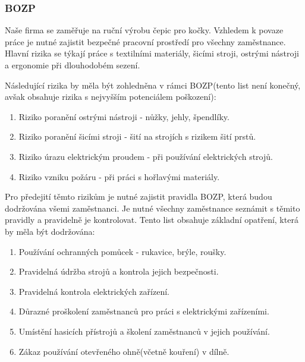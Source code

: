 \documentclass[12pt, a4paper]{article}
\begin{document}
\pagebreak

\subsubsection{BOZP}

Naše firma se zaměřuje na ruční výrobu čepic pro kočky. 
Vzhledem k povaze práce je nutné zajistit bezpečné pracovní prostředí pro všechny zaměstnance. 
Hlavní rizika se týkají práce s textilními materiály, šicími stroji, ostrými nástroji a ergonomie při dlouhodobém sezení.
\vspace{10pt}

Následující rizika by měla být zohledněna v rámci BOZP(tento list není konečný, avšak obsahuje rizika s nejvyšším potenciálem poškození):

\begin{enumerate}
  \item Riziko poranění ostrými nástroji - nůžky, jehly, špendlíky.
  \item Riziko poranění šicími stroji - šití na strojích s rizikem šití prstů.
  \item Riziko úrazu elektrickým proudem - při používání elektrických strojů.
  \item Riziko vzniku požáru - při práci s hořlavými materiály.
\end{enumerate}

\vspace{10pt}

Pro předejití těmto rizikům je nutné zajistit pravidla BOZP, která budou dodržována všemi zaměstnanci.
Je nutné všechny zaměstnance seznámit s těmito pravidly a pravidelně je kontrolovat. Tento list
obsahuje základní opatření, která by měla být dodržována:

\begin{enumerate}
  \item Používání ochranných pomůcek - rukavice, brýle, roušky.
  \item Pravidelná údržba strojů a kontrola jejich bezpečnosti.
  \item Pravidelná kontrola elektrických zařízení.
  \item Důrazné proškolení zaměstnanců pro práci s elektrickými zařízeními.
  \item Umístění hasicích přístrojů a školení zaměstnanců v jejich používání.
  \item Zákaz používání otevřeného ohně(včetně kouření) v dílně.
\end{enumerate}
\end{document}
